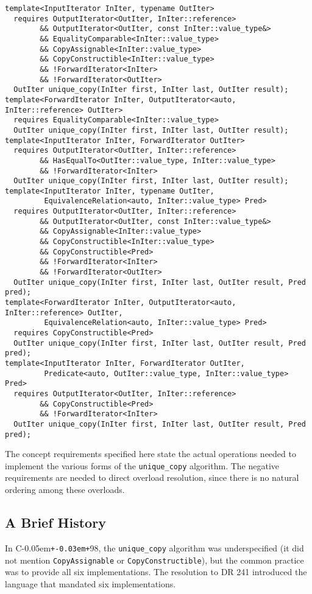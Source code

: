 \documentclass[american]{article}
\newcommand{\code}[1]{\lstinline[basicstyle=\sffamily,keywords={}]{#1}}
\newcommand{\Cpp}{C\kern-0.05em\texttt{+\kern-0.03em+}}
\newcommand{\tcode}[1]{\code{#1}}
\begin{document}
\begin{lstlisting}
template<InputIterator InIter, typename OutIter>
  requires OutputIterator<OutIter, InIter::reference>
        && OutputIterator<OutIter, const InIter::value_type&>
        && EqualityComparable<InIter::value_type> 
        && CopyAssignable<InIter::value_type>
        && CopyConstructible<InIter::value_type> 
        && !ForwardIterator<InIter> 
        && !ForwardIterator<OutIter>
  OutIter unique_copy(InIter first, InIter last, OutIter result);
template<ForwardIterator InIter, OutputIterator<auto, InIter::reference> OutIter>
  requires EqualityComparable<InIter::value_type>
  OutIter unique_copy(InIter first, InIter last, OutIter result);
template<InputIterator InIter, ForwardIterator OutIter>
  requires OutputIterator<OutIter, InIter::reference> 
        && HasEqualTo<OutIter::value_type, InIter::value_type>
        && !ForwardIterator<InIter>
  OutIter unique_copy(InIter first, InIter last, OutIter result);
template<InputIterator InIter, typename OutIter,
         EquivalenceRelation<auto, InIter::value_type> Pred>
  requires OutputIterator<OutIter, InIter::reference>
        && OutputIterator<OutIter, const InIter::value_type&>
        && CopyAssignable<InIter::value_type> 
        && CopyConstructible<InIter::value_type> 
        && CopyConstructible<Pred>
        && !ForwardIterator<InIter> 
        && !ForwardIterator<OutIter>
  OutIter unique_copy(InIter first, InIter last, OutIter result, Pred pred);
template<ForwardIterator InIter, OutputIterator<auto, InIter::reference> OutIter,
         EquivalenceRelation<auto, InIter::value_type> Pred>
  requires CopyConstructible<Pred>
  OutIter unique_copy(InIter first, InIter last, OutIter result, Pred pred);
template<InputIterator InIter, ForwardIterator OutIter,
         Predicate<auto, OutIter::value_type, InIter::value_type> Pred>
  requires OutputIterator<OutIter, InIter::reference> 
        && CopyConstructible<Pred>
        && !ForwardIterator<InIter>
  OutIter unique_copy(InIter first, InIter last, OutIter result, Pred pred);
\end{lstlisting}

The concept requirements specified here state the actual operations
needed to implement the various forms of the \tcode{unique_copy}
algorithm. The negative requirements are needed to direct overload
resolution, since there is no natural ordering among these overloads.

\subsection{A Brief History}
In \Cpp98, the \tcode{unique_copy} algorithm was underspecified (it
did not mention \tcode{CopyAssignable} or \tcode{CopyConstructible}),
but the common practice was to provide all six implementations. The
resolution to DR 241 introduced the language that mandated six
implementations. 
\end{document}
